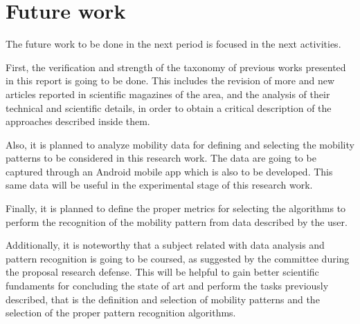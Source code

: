 \section{Future work}
\label{sec:future_work}
The future work to be done in the next period is focused in the next activities.

First, the verification and strength of the taxonomy of previous works presented in this report is going to be done.
This includes the revision of more and new articles reported in scientific magazines of the area, and the analysis of their technical and scientific details, in order to obtain a critical description of the approaches described inside them.

Also, it is planned to analyze mobility data for defining and selecting the mobility patterns to be considered in this research work.
The data are going to be captured through an Android mobile app which is also to be developed.
This same data will be useful in the experimental stage of this research work.

Finally, it is planned to define the proper metrics for selecting the algorithms to perform the recognition of the mobility pattern from data described by the user.

Additionally, it is noteworthy that a subject related with data analysis and pattern recognition is going to be coursed, as suggested by the committee during the proposal research defense.
This will be helpful to gain better scientific fundaments for concluding the state of art and perform the tasks previously described, that is the definition and selection of mobility patterns and the selection of the proper pattern recognition algorithms.
